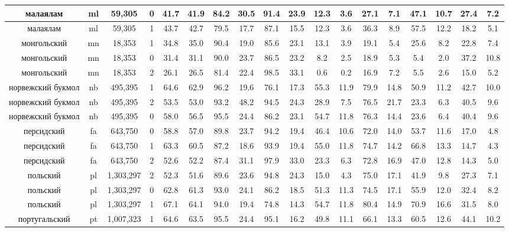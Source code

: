 \begin{table*}
{\begin{tabular}{|c|c|c|c||c|c|c|c|c|c|c|c|c|c|c|c|c|c|}
малаялам & ml & 59,305 & 0 & 41.7 & 41.9 & 84.2 & 30.5 & 91.4 & 23.9 & 12.3 & 3.6 & 27.1 & 7.1 & 47.1 & 10.7 & 27.4 & 7.2\\ \hline
малаялам & ml & 59,305 & 1 & 43.7 & 42.7 & 79.5 & 17.7 & 87.1 & 15.5 & 12.3 & 3.6 & 36.3 & 8.9 & 57.5 & 12.2 & 18.2 & 5.1\\ \hline
монгольский & mn & 18,353 & 1 & 34.8 & 35.0 & 90.4 & 19.0 & 85.6 & 23.1 & 13.1 & 3.9 & 19.1 & 5.4 & 25.6 & 8.2 & 22.8 & 7.4\\ \hline
монгольский & mn & 18,353 & 0 & 31.4 & 31.1 & 90.0 & 23.7 & 86.5 & 23.2 & 8.2 & 2.5 & 18.9 & 5.3 & 5.4 & 2.0 & 37.2 & 10.8\\ \hline
монгольский & mn & 18,353 & 2 & 26.1 & 26.5 & 81.4 & 22.4 & 98.5 & 33.1 & 0.6 & 0.2 & 16.9 & 7.2 & 5.5 & 2.6 & 15.0 & 5.2\\ \hline
норвежский букмол & nb & 495,395 & 1 & 64.6 & 62.9 & 96.2 & 19.6 & 76.1 & 17.3 & 55.3 & 11.9 & 79.9 & 14.8 & 50.9 & 11.2 & 42.7 & 10.0\\ \hline
норвежский букмол & nb & 495,395 & 2 & 53.5 & 53.0 & 93.2 & 48.2 & 94.5 & 24.3 & 28.9 & 7.5 & 76.5 & 21.7 & 23.3 & 6.3 & 40.5 & 9.6\\ \hline
норвежский букмол & nb & 495,395 & 0 & 58.0 & 56.5 & 95.5 & 24.4 & 86.2 & 23.1 & 54.7 & 11.8 & 76.3 & 14.4 & 23.6 & 6.4 & 40.4 & 9.6\\ \hline
персидский & fa & 643,750 & 0 & 58.8 & 57.0 & 89.8 & 23.7 & 94.2 & 19.4 & 46.4 & 10.6 & 72.0 & 14.0 & 53.7 & 11.6 & 17.0 & 4.8\\ \hline
персидский & fa & 643,750 & 1 & 63.3 & 60.5 & 87.2 & 18.6 & 93.9 & 19.4 & 55.0 & 11.8 & 74.7 & 14.2 & 66.8 & 13.3 & 14.7 & 4.3\\ \hline
персидский & fa & 643,750 & 2 & 52.6 & 52.2 & 87.4 & 31.1 & 97.9 & 33.0 & 23.3 & 6.3 & 72.8 & 16.9 & 47.0 & 12.8 & 14.3 & 5.0\\ \hline
польский & pl & 1,303,297 & 2 & 52.3 & 51.6 & 89.6 & 23.6 & 94.8 & 24.3 & 15.0 & 4.3 & 75.0 & 17.1 & 41.9 & 9.8 & 27.3 & 7.1\\ \hline
польский & pl & 1,303,297 & 0 & 62.8 & 61.3 & 93.0 & 24.1 & 86.2 & 18.5 & 51.3 & 11.3 & 74.5 & 17.1 & 55.9 & 12.0 & 32.4 & 8.2\\ \hline
польский & pl & 1,303,297 & 1 & 67.1 & 64.1 & 94.0 & 19.4 & 74.8 & 14.3 & 54.7 & 11.8 & 80.4 & 14.9 & 70.9 & 16.6 & 31.5 & 8.0\\ \hline
португальский & pt & 1,007,323 & 1 & 64.6 & 63.5 & 95.5 & 24.4 & 95.1 & 16.2 & 49.8 & 11.1 & 66.1 & 13.3 & 60.5 & 12.6 & 44.1 & 10.2\\ \hline

\end{tabular}}
\end{table*}
